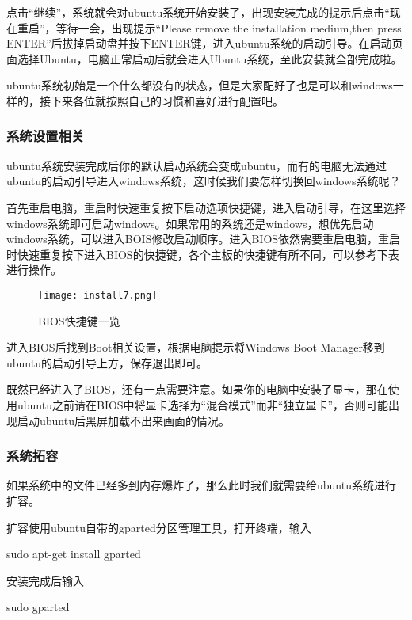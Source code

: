 点击“继续”，系统就会对ubuntu系统开始安装了，出现安装完成的提示后点击“现在重启”，等待一会，出现提示“Please remove the installation medium,then press ENTER”后拔掉启动盘并按下ENTER键，进入ubuntu系统的启动引导。在启动页面选择Ubuntu，电脑正常启动后就会进入Ubuntu系统，至此安装就全部完成啦。

ubuntu系统初始是一个什么都没有的状态，但是大家配好了也是可以和windows一样的，接下来各位就按照自己的习惯和喜好进行配置吧。

\subsubsection{系统设置相关}
ubuntu系统安装完成后你的默认启动系统会变成ubuntu，而有的电脑无法通过ubuntu的启动引导进入windows系统，这时候我们要怎样切换回windows系统呢？

首先重启电脑，重启时快速重复按下启动选项快捷键，进入启动引导，在这里选择windows系统即可启动windows。如果常用的系统还是windows，想优先启动windows系统，可以进入BOIS修改启动顺序。进入BIOS依然需要重启电脑，重启时快速重复按下进入BIOS的快捷键，各个主板的快捷键有所不同，可以参考下表进行操作。

\begin{figure}[H]
    \centering
    \texttt{[image: install7.png]}
    \caption{BIOS快捷键一览} %
    \label{fig:install7} %
\end{figure}

进入BIOS后找到Boot相关设置，根据电脑提示将Windows Boot Manager移到ubuntu的启动引导上方，保存退出即可。

既然已经进入了BIOS，还有一点需要注意。如果你的电脑中安装了显卡，那在使用ubuntu之前请在BIOS中将显卡选择为“混合模式”而非“独立显卡”，否则可能出现启动ubuntu后黑屏加载不出来画面的情况。

\subsubsection{系统拓容}

如果系统中的文件已经多到内存爆炸了，那么此时我们就需要给ubuntu系统进行扩容。

扩容使用ubuntu自带的gparted分区管理工具，打开终端，输入

\begin{tcode}
	sudo apt-get install gparted
\end{tcode}

安装完成后输入

\begin{tcode}
	sudo gparted
\end{tcode}

